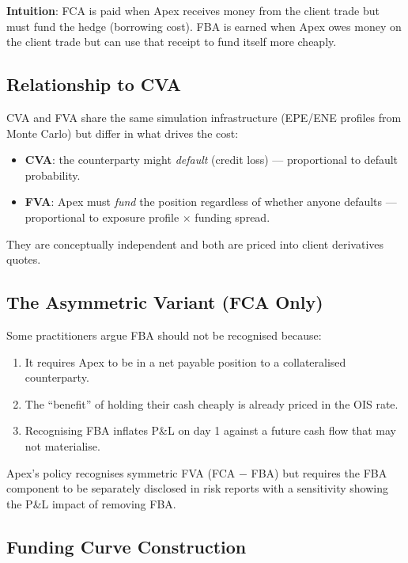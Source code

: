 \documentclass[11pt,a4paper]{article}
\begin{document}
\textbf{Intuition}: FCA is paid when Apex receives money from the client trade but must fund
the hedge (borrowing cost). FBA is earned when Apex owes money on the client trade but can use
that receipt to fund itself more cheaply.

\subsection{Relationship to CVA}

CVA and FVA share the same simulation infrastructure (EPE/ENE profiles from Monte Carlo) but
differ in what drives the cost:

\begin{itemize}[leftmargin=*]
  \item \textbf{CVA}: the counterparty might \emph{default} (credit loss) --- proportional to default probability.
  \item \textbf{FVA}: Apex must \emph{fund} the position regardless of whether anyone defaults --- proportional to exposure profile $\times$ funding spread.
\end{itemize}

They are conceptually independent and both are priced into client derivatives quotes.

\subsection{The Asymmetric Variant (FCA Only)}

Some practitioners argue FBA should not be recognised because:
\begin{enumerate}[leftmargin=*]
  \item It requires Apex to be in a net payable position to a collateralised counterparty.
  \item The ``benefit'' of holding their cash cheaply is already priced in the OIS rate.
  \item Recognising FBA inflates P\&L on day 1 against a future cash flow that may not materialise.
\end{enumerate}

Apex's policy recognises symmetric FVA (FCA $-$ FBA) but requires the FBA component to be
separately disclosed in risk reports with a sensitivity showing the P\&L impact of removing FBA.

\subsection{Funding Curve Construction}
\end{document}
